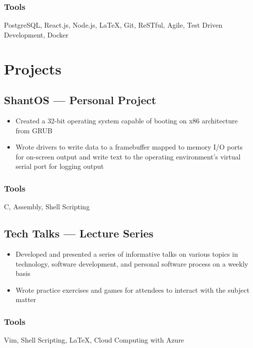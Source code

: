 \documentclass[11pt, letterpaper]{article}
\begin{document}
            \subsubsection{Tools}
                PostgreSQL, React.js, Node.js, LaTeX, Git, ReSTful, Agile, Test Driven Development, Docker

    \section{Projects}
        \subsection{ShantOS --- Personal Project}
            \begin{itemize}[nosep]
                \item Created a 32-bit operating system capable of booting on x86 architecture from GRUB 
                \item Wrote drivers to write data to a framebuffer mapped to memory I/O ports for 
                    on-screen output and write text to the operating environment's virtual serial 
                    port for logging output 
            \end{itemize}
            \subsubsection{Tools}
                C, Assembly, Shell Scripting

        \subsection{Tech Talks --- Lecture Series}
            \begin{itemize}[nosep]
                \item Developed and presented a series of informative talks on various topics in technology, 
                    software development, and personal software process on a weekly basis
                \item Wrote practice exercises and games for attendees to interact with the subject matter
            \end{itemize}
            \subsubsection{Tools}
                Vim, Shell Scripting, LaTeX, Cloud Computing with Azure
\end{document}
